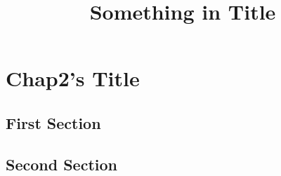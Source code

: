 \documentclass{article}
\begin{document}
\title{Something in Title}
\date{}
\maketitle
\else
\chapter{Chap2's Title}
\fi
\section{First Section}
\section{Second Section}
\ifx\allfiles\undefined
\end{document}

